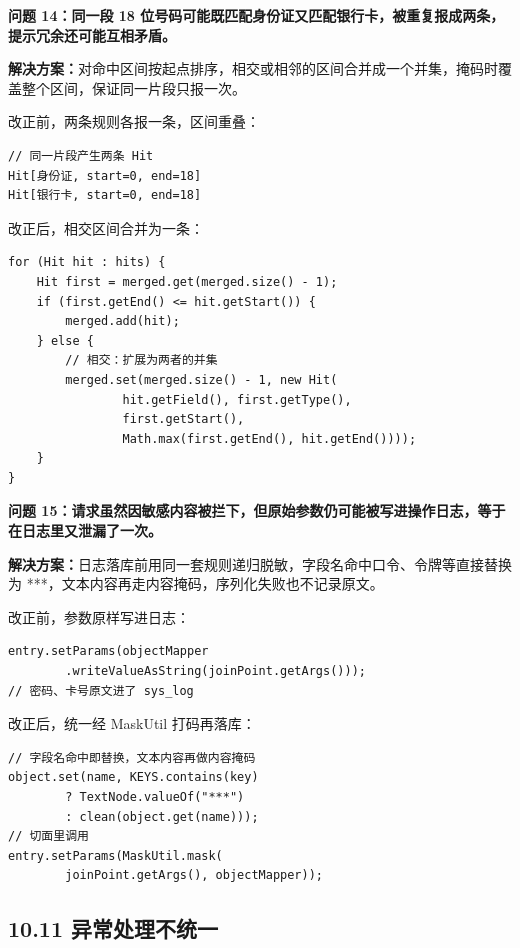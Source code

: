\documentclass[zihao=-4,UTF8,openany]{ctexart}
\renewcommand{\_}{\textunderscore\allowbreak}
\begin{document}
\noindent\textbf{问题 14：同一段 18 位号码可能既匹配身份证又匹配银行卡，被重复报成两条，提示冗余还可能互相矛盾。}

\textbf{解决方案：}对命中区间按起点排序，相交或相邻的区间合并成一个并集，掩码时覆盖整个区间，保证同一片段只报一次。

改正前，两条规则各报一条，区间重叠：

\begin{lstlisting}[language={},numbers=none]
// 同一片段产生两条 Hit
Hit[身份证, start=0, end=18]
Hit[银行卡, start=0, end=18]
\end{lstlisting}

改正后，相交区间合并为一条：

\begin{lstlisting}
for (Hit hit : hits) {
    Hit first = merged.get(merged.size() - 1);
    if (first.getEnd() <= hit.getStart()) {
        merged.add(hit);
    } else {
        // 相交：扩展为两者的并集
        merged.set(merged.size() - 1, new Hit(
                hit.getField(), first.getType(),
                first.getStart(),
                Math.max(first.getEnd(), hit.getEnd())));
    }
}
\end{lstlisting}

\noindent\textbf{问题 15：请求虽然因敏感内容被拦下，但原始参数仍可能被写进操作日志，等于在日志里又泄漏了一次。}

\textbf{解决方案：}日志落库前用同一套规则递归脱敏，字段名命中口令、令牌等直接替换为 ***，文本内容再走内容掩码，序列化失败也不记录原文。

改正前，参数原样写进日志：

\begin{lstlisting}
entry.setParams(objectMapper
        .writeValueAsString(joinPoint.getArgs()));
// 密码、卡号原文进了 sys_log
\end{lstlisting}

改正后，统一经 MaskUtil 打码再落库：

\begin{lstlisting}
// 字段名命中即替换，文本内容再做内容掩码
object.set(name, KEYS.contains(key)
        ? TextNode.valueOf("***")
        : clean(object.get(name)));
// 切面里调用
entry.setParams(MaskUtil.mask(
        joinPoint.getArgs(), objectMapper));
\end{lstlisting}

\subsection*{\texorpdfstring{\textbf{10.11 异常处理不统一}}{10.11 异常处理不统一}}\label{ux5f02ux5e38ux5904ux7431}
\end{document}

